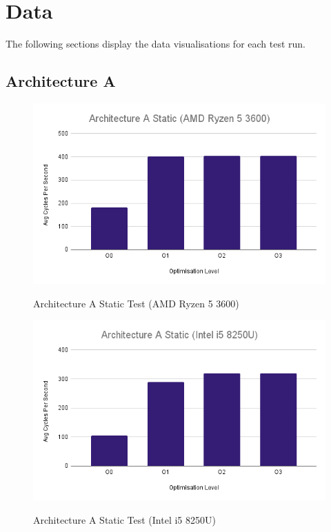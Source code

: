 \documentclass{article}
\begin{document}
\clearpage

\section{Data}
The following sections display the data visualisations for each test run.

\subsection{Architecture A}
\begin{figure}[!h]
\centering
\includegraphics[scale=0.5]{Architecture A Static (AMD Ryzen 5 3600).png}
\label{arch_a_static_pc}
\caption{Architecture A Static Test (AMD Ryzen 5 3600)}
\end{figure}

\begin{figure}[!h]
\centering
\includegraphics[scale=0.5]{Architecture A Static (Intel i5 8250U).png}
\label{arch_a_static_laptop}
\caption{Architecture A Static Test (Intel i5 8250U)}
\end{figure}
\end{document}
